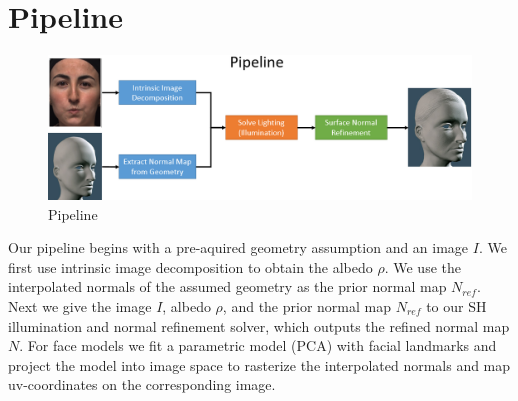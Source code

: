 \documentclass[10pt,twocolumn,letterpaper]{article}
\begin{document}
\section{Pipeline} 
\begin{figure}[!h]
    \begin{center}
        \includegraphics [scale=0.35] {image/pipeline.png}
    \end{center}
    \caption{Pipeline}
    \label{fig:pipe1}
\end{figure} 
Our pipeline begins with a pre-aquired geometry assumption and an image $I$. We first use intrinsic image decomposition to obtain the albedo $\rho$. We use the interpolated normals of the assumed geometry as the prior normal map $N_{ref}$. Next we give the image $I$, albedo $\rho$, and the prior normal map $N_{ref}$ to our SH illumination and normal refinement solver, which outputs the refined normal map $N$. For face models we fit a parametric model (PCA) with facial landmarks\cite{pca} and project the model into image space to rasterize the interpolated normals and map uv-coordinates on the corresponding image.
\end{document}
